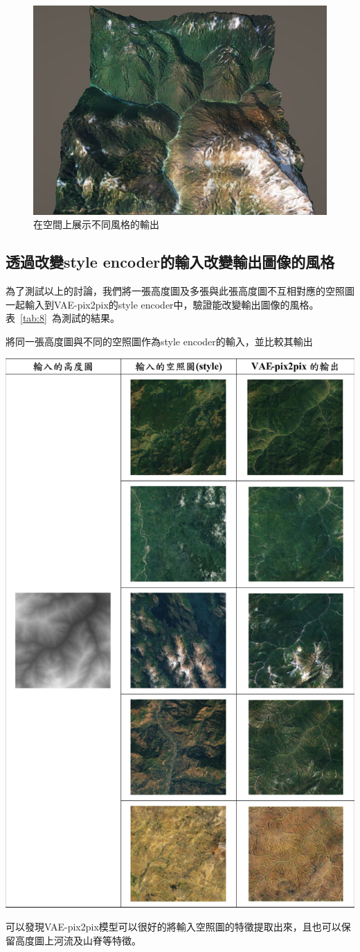 \documentclass[a4paper, 12pt]{article}
\begin{document}
\begin{figure}[htbp]
    \centering
    \includegraphics[width=0.7\linewidth]{fig/18.jpg}
    \caption{在空間上展示不同風格的輸出}
    \label{fig:18}
\end{figure}

\subsection{透過改變style encoder的輸入改變輸出圖像的風格}
為了測試以上的討論，我們將一張高度圖及多張與此張高度圖不互相對應的空照圖一起輸入到VAE-pix2pix的style encoder中，驗證能改變輸出圖像的風格。表~\ref{tab:8}~為測試的結果。
\begin{table}[htbp]
    \centering
    \caption{將同一張高度圖與不同的空照圖作為style encoder的輸入，並比較其輸出}
    \label{tab:8}
    \includegraphics[width=0.8\linewidth]{fig/tab8.jpg}
\end{table}
可以發現VAE-pix2pix模型可以很好的將輸入空照圖的特徵提取出來，且也可以保留高度圖上河流及山脊等特徵。
\end{document}
